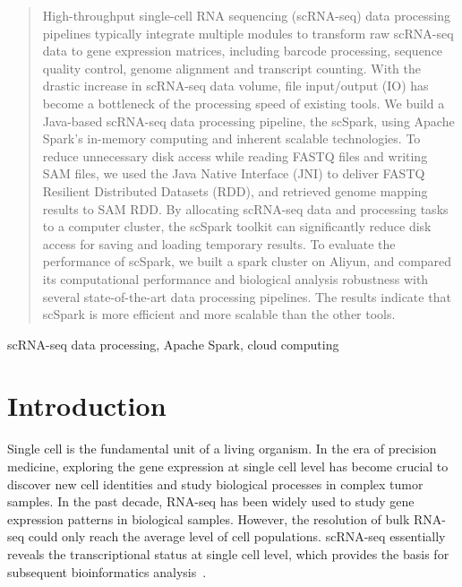 \documentclass[conference]{IEEEtran}
\begin{document}
\begin{abstract}
  High-throughput single-cell RNA sequencing (scRNA-seq) data processing pipelines typically integrate multiple modules to transform raw scRNA-seq data to gene expression matrices, including barcode processing, sequence quality control, genome alignment and transcript counting. 
  With the drastic increase in scRNA-seq data volume, file input/output (IO) has become a bottleneck of the processing speed of existing tools. 
We build a Java-based scRNA-seq data processing pipeline, the scSpark, using Apache Spark's in-memory computing and inherent scalable technologies. 
  To reduce unnecessary disk access while reading FASTQ files and writing SAM files, we used the Java Native Interface (JNI) to deliver FASTQ Resilient Distributed Datasets (RDD), and retrieved genome mapping results to SAM RDD. 
  By allocating scRNA-seq data and processing tasks to a computer cluster, the scSpark toolkit can significantly reduce disk access for saving and loading temporary results. 
  To evaluate the performance of scSpark, we built a spark cluster on Aliyun, and compared its computational performance and biological analysis robustness with several state-of-the-art data processing pipelines. The results indicate that scSpark is more efficient and more scalable than the other  tools. 
\end{abstract}

\begin{IEEEkeywords}
scRNA-seq data processing, Apache Spark, cloud computing
\end{IEEEkeywords}

\section{Introduction}
Single cell is the fundamental unit of a living organism.
In the era of precision medicine, exploring the gene expression at single cell level has become crucial to discover new cell identities and study biological processes in complex tumor samples.
In the past decade, RNA-seq has been widely used to study gene expression patterns in biological samples.
However, the resolution of bulk RNA-seq could only reach the average level of cell populations. 
scRNA-seq essentially reveals the transcriptional status at single cell level, which provides the basis for subsequent bioinformatics analysis~\cite{Papalexi2018SinglecellRS}.
\end{document}
